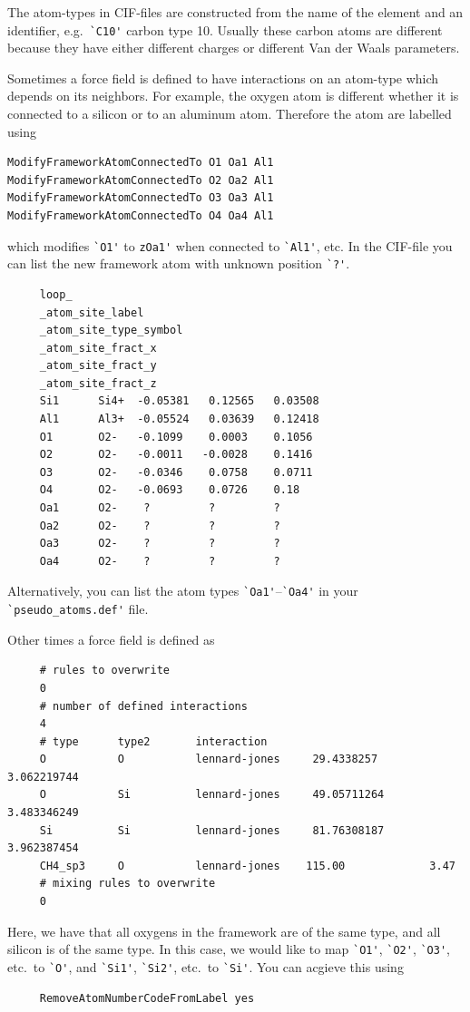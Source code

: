The atom-types in CIF-files are constructed from the name of the element and an identifier, e.g.\ \verb=`C10'= carbon type 10.
Usually these carbon atoms are different because they have either different charges or different Van der Waals parameters.

Sometimes a force field is defined to have interactions on an atom-type which depends on its neighbors. For example, the oxygen atom is different
whether it is connected to a silicon or to an aluminum atom. Therefore the atom are labelled using
\begin{verbatim}
ModifyFrameworkAtomConnectedTo O1 Oa1 Al1
ModifyFrameworkAtomConnectedTo O2 Oa2 Al1
ModifyFrameworkAtomConnectedTo O3 Oa3 Al1
ModifyFrameworkAtomConnectedTo O4 Oa4 Al1
\end{verbatim}
which modifies \verb=`O1'= to \verb=zOa1'= when connected to \verb=`Al1'=, etc.
In the CIF-file you can list the new framework atom with unknown position \verb=`?'=.
\begin{verbatim}
     loop_
     _atom_site_label
     _atom_site_type_symbol
     _atom_site_fract_x
     _atom_site_fract_y
     _atom_site_fract_z
     Si1      Si4+  -0.05381   0.12565   0.03508
     Al1      Al3+  -0.05524   0.03639   0.12418
     O1       O2-   -0.1099    0.0003    0.1056 
     O2       O2-   -0.0011   -0.0028    0.1416 
     O3       O2-   -0.0346    0.0758    0.0711 
     O4       O2-   -0.0693    0.0726    0.18   
     Oa1      O2-    ?         ?         ?      
     Oa2      O2-    ?         ?         ?      
     Oa3      O2-    ?         ?         ?      
     Oa4      O2-    ?         ?         ?      
\end{verbatim}
Alternatively, you can list the atom types \verb=`Oa1'=--\verb=`Oa4'= in your \verb=`pseudo_atoms.def'= file.

Other times a force field is defined as
\begin{verbatim}
     # rules to overwrite
     0
     # number of defined interactions
     4
     # type      type2       interaction
     O           O           lennard-jones     29.4338257        3.062219744
     O           Si          lennard-jones     49.05711264       3.483346249
     Si          Si          lennard-jones     81.76308187       3.962387454
     CH4_sp3     O           lennard-jones    115.00             3.47
     # mixing rules to overwrite
     0
\end{verbatim}
Here, we have that all oxygens in the framework are of the same type, and all silicon is of the same type.
In this case, we would like to map \verb=`O1'=, \verb=`O2'=, \verb=`O3'=, etc.\ to \verb=`O'=,
and \verb=`Si1'=, \verb=`Si2'=, etc.\ to \verb=`Si'=.
You can acgieve this using
\begin{verbatim}
     RemoveAtomNumberCodeFromLabel yes
\end{verbatim}

